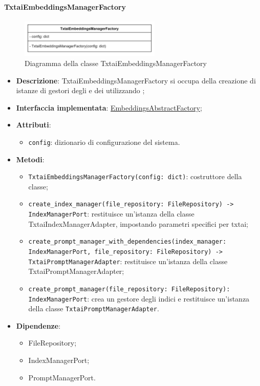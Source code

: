\paragraph{TxtaiEmbeddingsManagerFactory} \label{TxtaiEmbeddingsManagerFactory}
\begin{figure}[H]
    \centering
    \includegraphics[width=0.6\textwidth]{assets/Backend/txtai_embeddings_manager_factory.png}
    \caption{Diagramma della classe TxtaiEmbeddingsManagerFactory}
  \end{figure}
\begin{itemize}
    \item \textbf{Descrizione}: TxtaiEmbeddingsManagerFactory si occupa della creazione di istanze di gestori degli  e dei  utilizzando ;
    \item \textbf{Interfaccia implementata}: \hyperref[EmbeddingsAbstractFactory]{EmbeddingsAbstractFactory};
    \item \textbf{Attributi}:
    \begin{itemize}
        \item \texttt{config}: dizionario di configurazione del sistema.
    \end{itemize}
    \item \textbf{Metodi}:
    \begin{itemize}
        \item \texttt{TxtaiEmbeddingsManagerFactory(config: dict)}: costruttore della classe;
        \item \texttt{create\_index\_manager(file\_repository: FileRepository) -> IndexManagerPort}: restituisce un'istanza della classe TxtaiIndexManagerAdapter, impostando parametri specifici per txtai;
        \item \texttt{create\_prompt\_manager\_with\_dependencies(index\_manager: IndexManagerPort, file\_repository: FileRepository) -> TxtaiPromptManagerAdapter}: restituisce un'istanza della classe TxtaiPromptManagerAdapter;
        \item \texttt{create\_prompt\_manager(file\_repository: FileRepository): IndexManagerPort}: crea un gestore degli indici e restituisce un'istanza della classe \texttt{TxtaiPromptManagerAdapter}.
    \end{itemize}
    \item \textbf{Dipendenze}:
    \begin{itemize}
        \item FileRepository;
        \item IndexManagerPort;
        \item PromptManagerPort.
    \end{itemize}
\end{itemize} 

